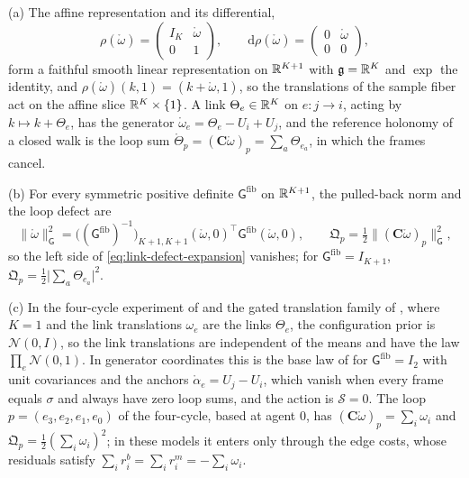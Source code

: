 (a) The affine representation and its differential,
\begin{equation}
\rho(\mathring\omega)=\begin{pmatrix}I_K&\mathring\omega\\0&1\end{pmatrix},
\qquad
\mathrm d\rho(\mathring\omega)=\begin{pmatrix}0&\mathring\omega\\0&0\end{pmatrix},
\label{eq:link-affine-representation}
\end{equation}
form a faithful smooth linear representation on $\mathbb R^{K+1}$ with $\mathfrak g=\mathbb R^K$ and $\exp$ the
identity, and $\rho(\mathring\omega)(k,1)=(k+\mathring\omega,1)$, so the translations of the sample fiber
act on the affine slice $\mathbb R^K\times\{1\}$. A link $\Theta_e\in\mathbb R^K$ on $e:j\to i$, acting by
$k\mapsto k+\Theta_e$, has the generator $\mathring\omega_e=\Theta_e-U_i+U_j$, and the reference holonomy
of a closed walk is the loop sum $\mathring\Theta_p=(\mathbf C\mathring\omega)_p=\sum_a\Theta_{e_a}$, in
which the frames cancel.

(b) For every symmetric positive definite $\mathsf G^{\mathrm{fib}}$ on $\mathbb R^{K+1}$, the pulled-back norm
and the loop defect are
\begin{equation}
\lVert\mathring\omega\rVert^2_{\mathsf G}
=\bigl((\mathsf G^{\mathrm{fib}})^{-1}\bigr)_{K+1,K+1}(\mathring\omega,0)^\top\mathsf G^{\mathrm{fib}}(\mathring\omega,0),
\qquad
\mathfrak Q_p=\tfrac12\bigl\lVert(\mathbf C\mathring\omega)_p\bigr\rVert^2_{\mathsf G},
\label{eq:link-translation-defect}
\end{equation}
so the left side of \cref{eq:link-defect-expansion} vanishes; for $\mathsf G^{\mathrm{fib}}=I_{K+1}$,
$\mathfrak Q_p=\tfrac12\lvert\sum_a\Theta_{e_a}\rvert^2$.

(c) In the four-cycle experiment of  and the gated translation
family of , where $K=1$ and the link translations $\omega_e$ are
the links $\Theta_e$, the configuration prior is $\mathcal N(0,I)$, so the link translations are
independent of the means and have the law $\prod_e\mathcal N(0,1)$. In generator coordinates this is the
base law of  for $\mathsf G^{\mathrm{fib}}=I_2$ with unit covariances and
the anchors $\mathring\alpha_e=U_j-U_i$, which vanish when every frame equals $\sigma$ and always have
zero loop sums, and the action is $\mathscr S=0$. The loop $p=(e_3,e_2,e_1,e_0)$ of the four-cycle,
based at agent $0$, has $(\mathbf C\mathring\omega)_p=\sum_i\omega_i$ and
$\mathfrak Q_p=\tfrac12(\sum_i\omega_i)^2$; in these models it enters only through the edge costs, whose
residuals satisfy $\sum_ir^b_i=\sum_ir^m_i=-\sum_i\omega_i$.

